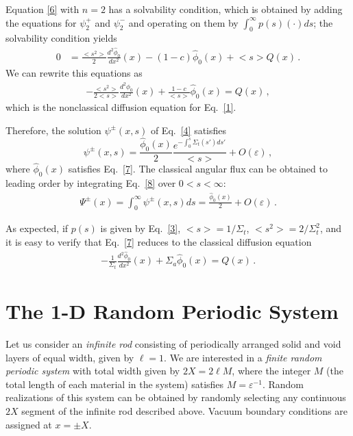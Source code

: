 \documentclass{anstrans}
\newcommand{\bl}{\big<}
\newcommand{\bg}{\big>}
\begin{document}
 Equation \eqref{6} with $n=2$ has a solvability condition, which is obtained by adding the equations for $\psi_2^+$ and $\psi_2^-$ and operating on them by $\int_0^{\infty} p(s) ( \cdot ) ds $; the solvability condition yields
   \begin{align}
      0 &= \frac{\bl s^2\bg}{2}\frac{d^2\hat\phi_0}{dx^2}(x) - (1-c)\hat\phi_0( x) + \bl s\bg Q( x)\,.\nonumber
   \end{align}
We can rewrite this equations as
\begin{align}
      -\frac{\bl s^2\bg}{2\bl s\bg}\frac{d^2\hat\phi_0}{dx^2}(x) + \frac{1-c}{\bl s\bg } \hat\phi_0(x) = Q(x)\,,\label{7}
      \end{align}
which is the nonclassical diffusion equation for Eq.\ \eqref{1}.

Therefore, the solution $\psi^\pm(x, s)$ of Eq.\ \eqref{4} satisfies
   \begin{equation}
      \psi^\pm(x, s) = \frac{\hat\phi_0(x)}{2} \frac{e^{- \int_0^s \Sigma_t( s') ds'}} {\bl s\bg} + O(\varepsilon) \,,\label{8}
   \end{equation} 
where $\hat\phi_0(x)$ satisfies Eq.\ \eqref{7}. The classical angular flux can be obtained to leading order by integrating Eq.\ \eqref{8} over $0 < s < \infty$:
   \begin{align}
   \Psi^\pm(x) = \int_0^{\infty}\psi^\pm(x,s)ds = \frac{\hat\phi_0(x)}{2}+ O(\varepsilon) \,.
   \nonumber
   \end{align}

As expected, if $p(s)$ is given by Eq.\ \eqref{3}, $\bl s\bg = 1/\Sigma_t$, $\bl s^2\bg = 2/\Sigma_t^2$, and it is easy to verify that Eq.\ \eqref{7} reduces to the classical diffusion equation
\begin{align}
 -\frac{1}{\Sigma_t}\frac{d^2\hat\phi_0}{dx^2}(x) + \Sigma_a \hat\phi_0(x) = Q(x)\,.\nonumber
\end{align}

\section{The 1-D Random Periodic System}
Let us consider an \textit{infinite rod} consisting of periodically arranged solid and void layers of equal width, given by $\ell=1$.
We are interested in a \textit{finite random periodic system} with total width given by $2X = 2\ell M$, where the integer $M$ (the total length of each material in the system) satisfies $M = \varepsilon^{-1}$. Random realizations of this system can be obtained by randomly selecting any continuous $2X$ segment of the infinite rod described above. Vacuum boundary conditions are assigned at $x=\pm X$. 
\end{document}
